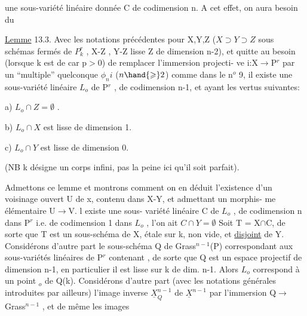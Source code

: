 
une sous-variété linéaire donnée C  de codimension n.  A cet effet,
on aura besoin du

\uline{Lemme} 13.3.  Avec les notations précédentes pour  X,Y,Z  ($X\supset Y\supset Z$
sous schémas fermés de $P^r_k$ , X-Z\hand{,} ,
Y-Z lisse \hand{,} Z de dimension \hand{$\leqslant$}n-2), et quitte
au besoin (lorsque k est de car p$>$0)  de remplacer l'immersion projecti-%
ve  i:X$\rightarrow$P$^r$  par  un ``multiple'' quelconque $\phi_n i$ ($n \hand{\geqslant} 2$)  comme dans le
n$^o$ 9,  il existe une sous-variété linéaire  $L_o$ de P$^r$ , de codimension
n-1, et ayant les vertus suivantes:

a)  $L_o \cap Z = \emptyset$ .

b)  $L_o \cap X$  est lisse de dimension 1.

c)  $L_o \cap Y$   est lisse de dimension  0.

(NB  k désigne un corps infini, pas la peine ici qu'il soit parfait).

Admettons  ce lemme  et montrons comment on en déduit  l'existence
d'un voisinage ouvert U de x, contenu dans X-Y, et admettant un morphis-%
me élémentaire U$\longrightarrow$V.  
 l existe une sous-%
variété linéaire C de $L_o$ , de codimension n dans P$^r$ i.e. de codimension
1 dans $L_o$ ,  
 l'on ait  $C \cap Y = \emptyset$  
 Soit  T = X$\cap$C, de sorte que T est un sous-schéma de X,
étale sur k, non vide, et \uline{disjoint} de Y.  Considérons d'autre part le
sous-schéma Q de Grass$^{n-1}$(P) correspondant aux sous-variétés linéaires
de P$^r$ contenant , de sorte que  Q est un  espace projectif
de dimension n-1,   en particulier il est lisse sur k de dim. n-1.
Alors $L_o$ correspond à un point \hand{$\xi$}$_o$ de Q(k).  Considérons d'autre part
(avec les notations générales introduites par ailleurs)  l'image inverse
$\underline{X}^{n-1}_Q$ de $\underline{X}^{n-1}$  par  l'immersion Q$\longrightarrow$ Grass$^{n-1}$ , et de même les images

